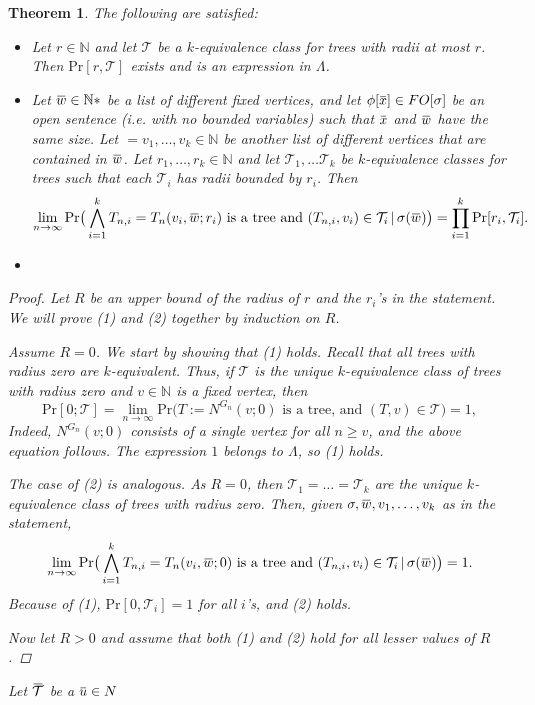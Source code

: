 \documentclass[12pt,notitlepage,a4paper]{article}
\newtheorem{theorem}{Theorem}[section]
\theoremstyle{definition}
\newcommand{\N}{\mathbb{N}}
\newcommand{\Ln}{\lim\limits_{n\to \infty}}
\newcommand{\overbar}[1]{\mkern 1.5mu\overline{\mkern-1.5mu#1\mkern-1.5mu}\mkern 1.5mu}
\begin{document}
\begin{theorem} 
	The following are satisfied:
	\begin{itemize}
		\item[(1)] Let $r\in \N$ and let $\mathcal{T}$ be a
		$k$-equivalence class for trees with radii at most $r$.
		Then $\mathrm{Pr}[r,\mathcal{T}]$ exists and is an expression
		in $\Lambda$.
		\item[(2)] Let $\overbar{w}\in \N*$ be a list of different fixed 
		vertices, and let $\phi[\overbar{x}]\in FO[\sigma]$ be an open sentence
		(i.e. with no bounded variables) such that $\overbar{x}$ and $\overbar{w}$
		have the same size. Let $=v_1,\dots,v_k \in \N$ be another 
		list of different vertices that are contained in $\overbar{w}$.
		Let $r_1,\dots,r_k \in \N$ and let $\mathcal{T}_1,\dots \mathcal{T}_k$
		be $k$-equivalence classes for trees such that
		each $\mathcal{T}_i$ has radii bounded by $r_i$. Then
		\[
		\Ln \mathrm{Pr}\big( \bigwedge_{i=1}^k 
		T_{n,i}=T_n(v_i,\overbar{w};r_i) \text{ is a tree and } 
		(T_{n,i},v_i)\in \mathcal{T}_i \, | \, \sigma(\overbar{w})
		\big)= \prod_{i=1}^k \mathrm{Pr}[r_i,\mathcal{T}_i]. \]	
		\item[(3)] 	
	\end{itemize}
	\begin{proof}
		Let $R$ be an upper bound of the radius of $r$ and the 
		$r_i$'s	in the statement. 
		We will prove (1) and (2) together by induction on $R$. \par
		Assume $R=0$. We start by showing that (1) holds. Recall that
		all trees with radius zero are $k$-equivalent. Thus, if
		$\mathcal{T}$ is the unique $k$-equivalence class of trees
		with radius zero
		and $v\in \N$ is a fixed vertex, then
		 \[
		 \mathrm{Pr}[0;\mathcal{T}] = \Ln \mathrm{Pr}\big( 
		 T:=N^{G_n}(v;0) \text{ is a tree, and } (T,v)\in \mathcal{T} \big)
		 =1, 
		 \]
		Indeed, $N^{G_n}(v;0)$ consists of a single vertex for all $n\geq v$,
		and the above equation follows. The expression $1$ belongs to 
		$\Lambda$, so (1) holds. \par
		The case of (2) is analogous. As $R=0$, then $\mathcal{T}_1=\dots=
		\mathcal{T}_k$ are the unique $k$-equivalence class of trees with
		radius zero. Then, given $\sigma, \overbar{w}, v_1,\dots, v_k$ as
		in the statement,
		\[\Ln \mathrm{Pr}\big( \bigwedge_{i=1}^k 
		T_{n,i}=T_n(v_i,\overbar{w};0) \text{ is a tree and } 
		(T_{n,i},v_i)\in \mathcal{T}_i \, | \, \sigma(\overbar{w})
		\big)=1. \]	
		Because of (1), $\mathrm{Pr}[0,\mathcal{T}_i]=1$ for all $i$'s, 
		and (2) holds. \par
		Now let $R>0$ and assume that both (1) and (2) hold for all 
		lesser values of $R$.  \par
		
		
		
		
	\end{proof}
	
Let $\overbar{\mathcal{T}}$ be a  $\overbar{u}\in N$
	
\end{theorem}
\end{document}
